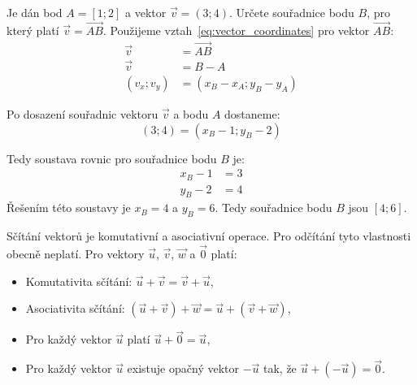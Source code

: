 \begin{example}
    Je dán bod $A = [1; 2]$ a vektor $\vec{v} = (3; 4)$. 
    Určete souřadnice bodu $B$, pro který platí $\vec{v} = \overrightarrow{AB}$.
    Použijeme vztah~\eqref{eq:vector_coordinates} pro vektor $\overrightarrow{AB}$:
    \begin{align*}
        \vec{v} &= \overrightarrow{AB} \\
        \vec{v} & = B - A \\
        (v_x; v_y)  &= (x_B - x_A; y_B - y_A)
    \end{align*}

    Po dosazení souřadnic vektoru $\vec{v}$ a bodu $A$ dostaneme:
    \[
    (3;4) = (x_B - 1; y_B - 2)
    \]

    Tedy soustava rovnic pro souřadnice bodu $B$ je:
    \begin{align*}
        x_B - 1 &= 3 \\
        y_B - 2 &= 4
    \end{align*}
    Řešením této soustavy je $x_B = 4$ a $y_B = 6$.
    Tedy souřadnice bodu $B$ jsou $[4; 6]$.
\end{example}

Sčítání vektorů je komutativní a asociativní operace.
Pro odčítání tyto vlastnosti obecně neplatí.
Pro vektory $\vec{u}$, $\vec{v}$, $\vec{w}$ a $\vec{0}$ platí:
\begin{itemize}
    \item Komutativita sčítání: $\vec{u} + \vec{v} = \vec{v} + \vec{u}$,
    \item Asociativita sčítání: $(\vec{u} + \vec{v}) + \vec{w} = \vec{u} + (\vec{v} + \vec{w})$,
    \item Pro každý vektor $\vec{u}$ platí $\vec{u} + \vec{0} = \vec{u}$,
    \item Pro každý vektor $\vec{u}$ existuje opačný vektor $-\vec{u}$ tak, že $\vec{u} + (-\vec{u}) = \vec{0}$.
\end{itemize}


